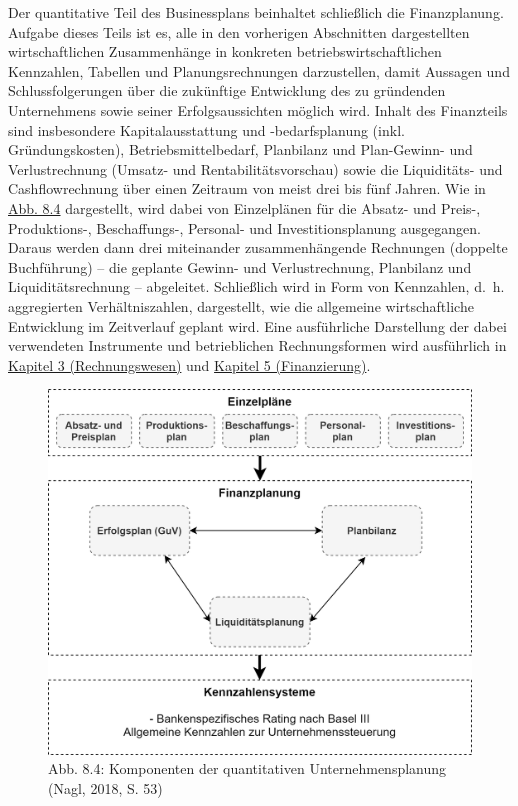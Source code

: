 \documentclass[
  letterpaper,
]{book}
\begin{document}
Der quantitative Teil des Businessplans beinhaltet schließlich die
Finanzplanung. Aufgabe dieses Teils ist es, alle in den vorherigen
Abschnitten dargestellten wirtschaftlichen Zusammenhänge in konkreten
betriebswirtschaftlichen Kennzahlen, Tabellen und Planungsrechnungen
darzustellen, damit Aussagen und Schlussfolgerungen über die zukünftige
Entwicklung des zu gründenden Unternehmens sowie seiner
Erfolgsaussichten möglich wird. Inhalt des Finanzteils sind insbesondere
Kapitalausstattung und -bedarfsplanung (inkl. Gründungskosten),
Betriebsmittelbedarf, Planbilanz und Plan-Gewinn- und Verlustrechnung
(Umsatz- und Rentabilitätsvorschau) sowie die Liquiditäts- und
Cashflowrechnung über einen Zeitraum von meist drei bis fünf Jahren. Wie
in \hyperref[figure84]{Abb. 8.4} dargestellt, wird dabei von
Einzelplänen für die Absatz- und Preis-, Produktions-, Beschaffungs-,
Personal- und Investitionsplanung ausgegangen. Daraus werden dann drei
miteinander zusammenhängende Rechnungen (doppelte Buchführung) -- die
geplante Gewinn- und Verlustrechnung, Planbilanz und Liquiditätsrechnung
-- abgeleitet. Schließlich wird in Form von Kennzahlen, d.~h.
aggregierten Verhältniszahlen, dargestellt, wie die allgemeine
wirtschaftliche Entwicklung im Zeitverlauf geplant wird. Eine
ausführliche Darstellung der dabei verwendeten Instrumente und
betrieblichen Rechnungsformen wird ausführlich in
\hyperref[rechnungswesen]{Kapitel 3 (Rechnungswesen)} und
\hyperref[betriebswirtschaftliche-finanzierungsformen]{Kapitel 5
(Finanzierung)}.

\begin{figure}

\includegraphics[width=0.75\linewidth,height=\textheight,keepaspectratio]{images/figure84.png} \hfill{}

\caption{Abb. 8.4: Komponenten der quantitativen Unternehmensplanung
(Nagl, 2018, S. 53)}

\end{figure}%
\end{document}
